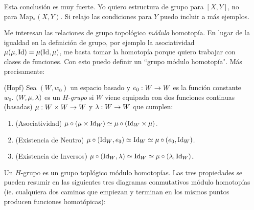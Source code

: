 \documentclass[../../topologia_algebraica]{subfiles}
\begin{document}
Esta conclusi\'on es muy fuerte. Yo quiero estructura de grupo para $[X,Y]$, no para $\text{Map}_*(X,Y)$.
Si relajo las condiciones para $Y$ puedo incluir a m\'as ejemplos.

Me interesan las relaciones de grupo topol\'ogico \emph{m\'odulo} homotop\'ia. En lugar de la igualdad
en la definici\'on de grupo, por ejemplo la asociatividad $\mu(\mu,\text{Id})=\mu(\text{Id},\mu)$, me basta
tomar la homotop\'ia porque quiero trabajar con clases de funciones. Con esto puedo definir
un ``grupo m\'odulo homotop\'ia". M\'as precisamente:

\begin{defin}(Hopf)
  Sea $(W,w_0)$ un espacio basado y $e_0:W\rightarrow W$ es la funci\'on constante $w_0$. $(W,\mu,\lambda)$ es un
  $H$-\emph{grupo} si $W$ viene equipada con dos funciones continuas (basadas)
  $\mu:W\times W\rightarrow W$ y $\lambda:W\rightarrow W$ que cumplen:
  \begin{enumerate}
  \item (Asociatividad) $\mu\circ(\mu\times\text{Id}_W)\simeq\mu\circ(\text{Id}_W\times\mu)$.
  \item (Existencia de Neutro) $\mu\circ(\text{Id}_W,e_0)\simeq\text{Id}_W\simeq\mu\circ(e_0,\text{Id}_W)$.
  \item (Existencia de Inversos) $\mu\circ(\text{Id}_W,\lambda)\simeq\text{Id}_W\simeq\mu\circ(\lambda,\text{Id}_W)$.
  \end{enumerate}
\end{defin}

Un $H$-grupo es un grupo topl\'ogico m\'odulo homotop\'ias. Las tres propiedades se pueden
resumir en las siguientes tres diagramas conmutativos m\'odulo homotop\'ias (ie. cualquiera dos caminos
que empiezan y terminan en los mismos puntos producen funciones homot\'opicas):
\end{document}
